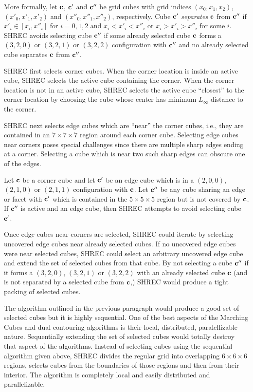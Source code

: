 More formally,
let $\mathbf{c}$, $\mathbf{c}'$ and $\mathbf{c}''$ be grid cubes with grid indices
$(x_0,x_1,x_2)$, $(x'_0,x'_1,x'_2)$ and $(x''_0,x''_1,x''_2)$, respectively.
Cube $\mathbf{c}'$ {\em separates} $\mathbf{c}$ from $\mathbf{c}''$
if $x'_i \in [x_i,x''_i]$ for $i = 0,1,2$
and $x_i < x'_i < x''_i$ or $x_i > x'_i > x''_i$ for some $i$.
SHREC avoids selecting cube $\mathbf{c}''$ if some already selected cube $\mathbf{c}$
forms a $(3,2,0)$ or $(3,2,1)$ or $(3,2,2)$ configuration with $\mathbf{c}''$
and no already selected cube separates $\mathbf{c}$ from $\mathbf{c}''$.

SHREC first selects corner cubes.
When the corner location is inside an active cube,
SHREC selects the active cube containing the corner.
When the corner location is not in an active cube,
SHREC selects the active cube ``closest'' to the corner location
by choosing the cube whose center has minimum $L_\infty$ distance
to the corner.

SHREC next selects edge cubes which are ``near'' the corner cubes,
i.e., they are contained in an $7 \times 7 \times 7$ region
around each corner cube.
Selecting edge cubes near corners poses special challenges
since there are multiple sharp edges ending at a corner.
Selecting a cube which is near two such sharp edges
can obscure one of the edges.

Let $\mathbf{c}$ be a corner cube and let $\mathbf{c}'$ be an edge cube
which is in a $(2,0,0)$, $(2,1,0)$ or $(2,1,1)$ configuration with $\mathbf{c}$.
Let $\mathbf{c}''$ be any cube sharing an edge or facet with $\mathbf{c}'$
which is contained in the $5 \times 5 \times 5$ region
but is not covered by $\mathbf{c}$.
If $\mathbf{c}''$ is active and an edge cube,
then SHREC attempts to avoid selecting cube $\mathbf{c}'$.

Once edge cubes near corners are selected,
SHREC could iterate by selecting uncovered edge cubes 
near already selected cubes.
If no uncovered edge cubes were near selected cubes,
SHREC could select an arbitrary uncovered edge cube
and extend the set of selected cubes from that cube.
By not selecting a cube $\mathbf{c}''$ 
if it forms a $(3,2,0)$, $(3,2,1)$ or $(3,2,2)$
with an already selected cube $\mathbf{c}$ 
(and is not separated by a selected cube from $\mathbf{c}$,)
SHREC would produce a tight packing of selected cubes.

The algorithm outlined in the previous paragraph would produce
a good set of selected cubes but it is highly sequential.
One of the best aspects of the Marching Cubes and dual contouring algorithms
is their local, distributed, paralellizable nature.
Sequentially extending the set of selected cubes would totally destroy
that aspect of the algorithms.
Instead of selecting cubes using the sequential algorithm given above,
SHREC divides the regular grid 
into overlapping $6 \times 6 \times 6$ regions,
selects cubes from the boundaries of those regions and then from their interior.
The algorithm is completely local and easily distributed and parallelizable.

